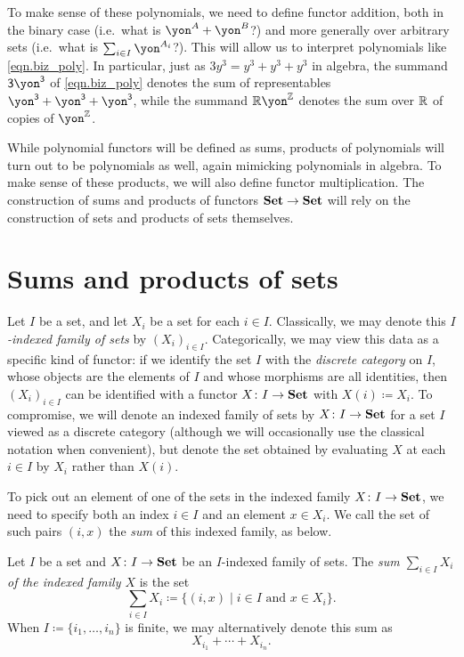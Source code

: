 \documentclass[Book-Poly]{subfiles}
\begin{document}
To make sense of these polynomials, we need to define functor addition, both in the binary case (i.e.\ what is $\yon^A+\yon^B$?) and more generally over arbitrary sets (i.e.\ what is $\sum_{i\in I}\yon^{A_i}$?).
This will allow us to interpret polynomials like \eqref{eqn.biz_poly}.
In particular, just as $3y^3=y^3+y^3+y^3$ in algebra, the summand $\3\yon^\3$ of \eqref{eqn.biz_poly} denotes the sum of representables $\yon^\3+\yon^\3+\yon^\3$, while the summand $\rr\yon^\zz$ denotes the sum over $\mathbb{R}$ of copies of $\yon^\zz$.

While polynomial functors will be defined as sums, products of polynomials will turn out to be polynomials as well, again mimicking polynomials in algebra.
To make sense of these products, we will also define functor multiplication.
The construction of sums and products of functors $\mathbf{Set}\to\mathbf{Set}$ will rely on the construction of sets and products of sets themselves.

\section{Sums and products of sets} \label{sec.poly.rep-sets.sum-prod-set}

Let $I$ be a set, and let $X_i$ be a set for each $i\in I$.
Classically, we may denote this \emph{$I$-indexed family of sets} by $(X_i)_{i\in I}$.
Categorically, we may view this data as a specific kind of functor: if we identify the set $I$ with the \emph{discrete category} on $I$, whose objects are the elements of $I$ and whose morphisms are all identities, then $(X_i)_{i\in I}$ can be identified with a functor $X\colon I\to\mathbf{Set}$ with $X(i)\coloneqq X_i$.
To compromise, we will denote an indexed family of sets by $X\colon I\to\mathbf{Set}$ for a set $I$ viewed as a discrete category (although we will occasionally use the classical notation when convenient), but denote the set obtained by evaluating $X$ at each $i\in I$ by $X_i$ rather than $X(i)$.

To pick out an element of one of the sets in the indexed family $X\colon I\to\mathbf{Set}$, we need to specify both an index $i\in I$ and an element $x\in X_i$.
We call the set of such pairs $(i,x)$ the \emph{sum} of this indexed family, as below.

\begin{definition} \label{def.sum_sets}
    Let $I$ be a set and $X\colon I\to\mathbf{Set}$ be an $I$-indexed family of sets.
    The \emph{sum $\sum_{i\in I}X_i$ of the indexed family $X$} is the set
    \[
    \sum_{i\in I}X_i\coloneqq\{(i,x)\mid i\in I\text{ and }x\in X_i\}.
    \]
    When $I\coloneqq\{i_1,\ldots,i_n\}$ is finite, we may alternatively denote this sum as
    \[
    X_{i_1}+\cdots+X_{i_n}.
    \]
\end{definition}
\end{document}
